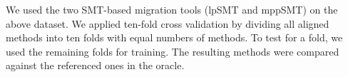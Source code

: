 
We used the two SMT-based migration tools (lpSMT and mppSMT) on the
above dataset. We applied ten-fold cross validation by dividing all
aligned methods into ten folds with equal numbers of methods. To test
for a fold, we used the remaining folds for training. The resulting
methods were compared against the referenced ones in the oracle. 



